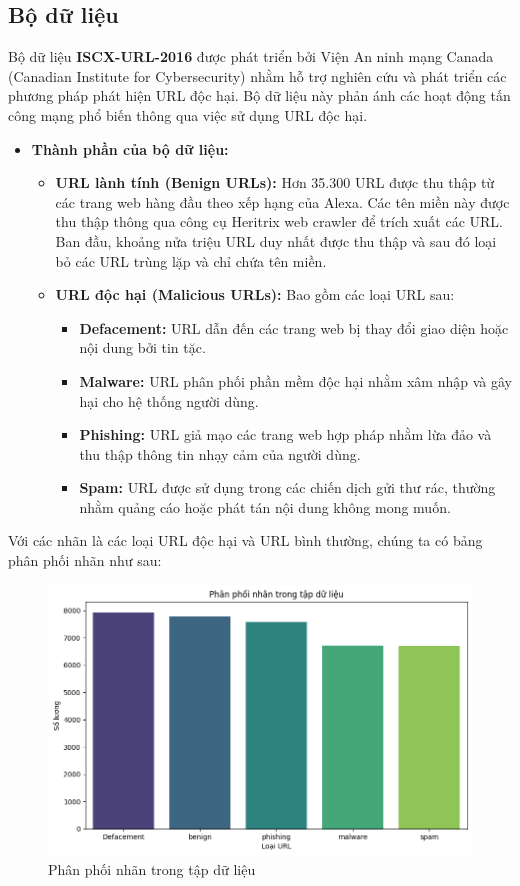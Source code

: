 \documentclass[13pt]{article}
\begin{document}
\subsection{Bộ dữ liệu}
Bộ dữ liệu \textbf{ISCX-URL-2016} được phát triển bởi Viện An ninh mạng Canada (Canadian Institute for Cybersecurity) nhằm hỗ trợ nghiên cứu và phát triển các phương pháp phát hiện URL độc hại. Bộ dữ liệu này phản ánh các hoạt động tấn công mạng phổ biến thông qua việc sử dụng URL độc hại.
\begin{itemize}
    \item \textbf{Thành phần của bộ dữ liệu:}
    \begin{itemize}
        \item \textbf{URL lành tính (Benign URLs): } Hơn 35.300 URL được thu thập từ các trang web hàng đầu theo xếp hạng của Alexa. Các tên miền này được thu thập thông qua công cụ Heritrix web crawler để trích xuất các URL. Ban đầu, khoảng nửa triệu URL duy nhất được thu thập và sau đó loại bỏ các URL trùng lặp và chỉ chứa tên miền. 
        \item \textbf{URL độc hại (Malicious URLs): } Bao gồm các loại URL sau:
        \begin{itemize}
            \item \textbf{Defacement: } URL dẫn đến các trang web bị thay đổi giao diện hoặc nội dung bởi tin tặc.
            \item \textbf{Malware: } URL phân phối phần mềm độc hại nhằm xâm nhập và gây hại cho hệ thống người dùng.
            \item \textbf{Phishing: } URL giả mạo các trang web hợp pháp nhằm lừa đảo và thu thập thông tin nhạy cảm của người dùng.
            \item \textbf{Spam: } URL được sử dụng trong các chiến dịch gửi thư rác, thường nhằm quảng cáo hoặc phát tán nội dung không mong muốn.
        \end{itemize}
    \end{itemize}
\end{itemize}

Với các nhãn là các loại URL độc hại và URL bình thường, chúng ta có bảng phân phối nhãn như sau:

    \begin{figure}[h!]
        \centering        \includegraphics[width=0.7\linewidth]{image/h15.png}
            \caption{Phân phối nhãn trong tập dữ liệu}
            \label{fig:label1}
    \end{figure}
\end{document}
